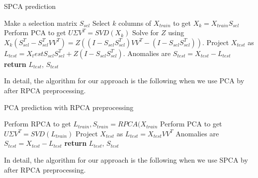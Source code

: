 \documentclass[conference]{IEEEtran}
\begin{document}
\begin{algorithm}
\caption{SPCA prediction}\label{alg:spca prediction}
\begin{algorithmic}[1]
\State Make a selection matrix $S_{sel}$
\State Select $k$ columns of $X_{train}$ to get $X_k = X_{train} S_{sel}$
\State Perform PCA to get $U \Sigma V^T = SVD(X_k)$
\State Solve for $Z$ using $X_k (S_{sel}^T - S_{sel}^T V V^T) = Z ((I-S_{sel} S_{sel}^T)V V^T - (I-S_{sel} S_{sel}^T))$.
\State Project $X_{test}$ as $L_{test} = X_test S_{sel} S_{sel}^T + Z (I-S_{sel} S_{sel}^T)$.
\State Anomalies are $S_{test} = X_{test} - L_{test}$
\State \textbf{return} $L_{test}$, $S_{test}$
\EndProcedure
\end{algorithmic}
\end{algorithm}

In detail, the algorithm for our approach is the following when we use PCA by after RPCA preprocessing. 

\begin{algorithm}
\caption{PCA prediction with RPCA preprocessing}\label{alg:pca and rpca prediction}
\begin{algorithmic}[1]
\State Perform RPCA to get $L_{train}, S_{train} = RPCA(X_{train}$
\State Perform PCA to get $U \Sigma V^T = SVD(L_{train})$
\State Project $X_{test}$ as $L_{test} = X_{test} V V^T$
\State Anomalies are $S_{test} = X_{test} - L_{test}$
\State \textbf{return} $L_{test}$, $S_{test}$
\EndProcedure
\end{algorithmic}
\end{algorithm}

In detail, the algorithm for our approach is the following when we use SPCA by after RPCA preprocessing. 
\end{document}
